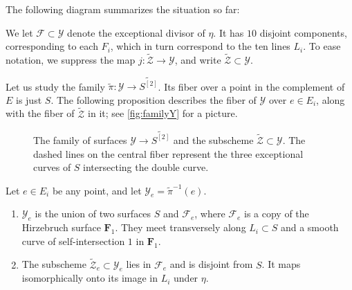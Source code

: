 \documentclass[12pt,reqno]{amsart}
\renewcommand{\to}{{\longrightarrow}}
\numberwithin{equation}{section}
\newcommand{\F}{\mathbf F}
\newcommand{\td}{\widetilde}
\begin{document}
The following diagram summarizes the situation so far:
\begin{center}
\end{center}

We let $\mathcal{F} \subset \mathcal{Y}$ denote the exceptional
divisor of $\eta$. It has $10$ disjoint components, corresponding to
each $F_{i}$, which in turn correspond to the ten lines $L_{i}$.
To ease notation, we suppress the map $j \colon \widetilde{\mathcal Z} \to \mathcal Y$, and write $\widetilde{\mathcal Z} \subset \mathcal Y$.

Let us study the family $\widetilde \pi \colon \mathcal Y \to \widetilde{S^{[2]}}$.
Its fiber over a point in the complement of $E$ is just $S$.
The following proposition describes the fiber of $\mathcal Y$ over $e \in E_i$, along with the fiber of $\widetilde{\mathcal Z}$ in it; see \autoref{fig:familyY} for a picture.
\begin{figure}
  \centering
    
    \caption{The family of surfaces $\mathcal Y \to \widetilde {S^{[2]}}$ and the subscheme $\widetilde {\mathcal Z} \subset \mathcal Y$.
      The dashed lines on the central fiber represent the three exceptional curves of $S$ intersecting the double curve.
    }
    \label{fig:familyY}
\end{figure}

\begin{proposition}
  \label{prop:geometry}
  Let $e \in E_{i}$ be any point, and let
  $\mathcal{Y}_{e} = \widetilde \pi^{-1}(e)$.
  \begin{enumerate}
  \item $\mathcal{Y}_{e}$ is the union of two surfaces $S$ and $\mathcal F_e$, where $\mathcal F_e$ is a copy of the Hirzebruch surface $\F_1$.
    They meet transversely along $L_{i} \subset S$ and a smooth curve of self-intersection $1$ in $\F_1$.
  \item The subscheme $\widetilde{\mathcal Z}_e \subset \mathcal Y_e$ lies in $\mathcal F_e$ and is disjoint from $S$.
    It maps isomorphically onto its image in $L_{i}$ under $\eta$.
  \end{enumerate}
\end{proposition}
\end{document}
